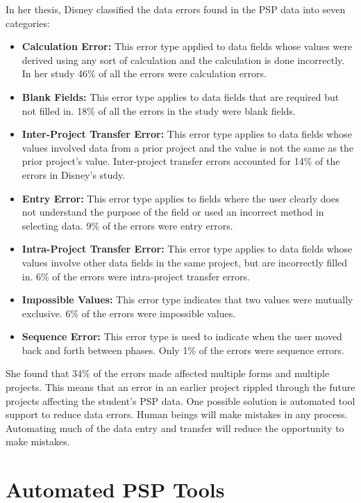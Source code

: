 In her thesis, Disney classified the data errors found in the PSP data into
seven categories:
\begin{itemize}
\item{{\bf Calculation Error:} This error type applied to data fields whose
values were derived using any sort of calculation and the calculation is done
incorrectly. In her study 46\% of all the errors were calculation errors.} 
\item{{\bf Blank Fields:} This error type applies to data fields that are
required but not filled in. 18\% of all the errors in the study were blank fields.}
\item{{\bf Inter-Project Transfer Error:} This error type applies to data
fields whose values involved data from a prior project and the value is not the 
same as the prior project's value. Inter-project transfer errors accounted for
14\% of the errors in Disney's study.}
\item{{\bf Entry Error:} This error type applies to fields where the user
clearly does not understand the purpose of the field or used an incorrect
method in selecting data. 9\% of the errors were entry errors.}
\item{{\bf Intra-Project Transfer Error:} This error type applies to data
fields whose values involve other data fields in the same project, but are
incorrectly filled in. 6\% of the errors were intra-project transfer errors.}
\item{{\bf Impossible Values:} This error type indicates that two values were
mutually exclusive. 6\% of the errors were impossible values.}
\item{{\bf Sequence Error:} This error type is used to indicate when the user
moved back and forth between phases. Only 1\% of the errors were sequence errors.}
\end{itemize}

She found that 34\% of the errors made affected multiple forms and multiple
projects.  This means that an error in an earlier project rippled through the
future projects affecting the student's PSP data. One possible solution is
automated tool support to reduce data errors. Human beings will make mistakes
in any process.  Automating much of the data entry and transfer will reduce the
opportunity to make mistakes.

\section{Automated PSP Tools}

